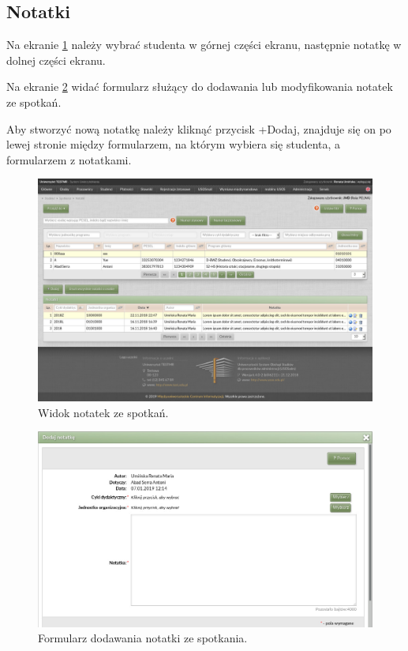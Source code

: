 \documentclass[licencjacka]{pracamgr}
\begin{document}
\subsection{Notatki}
Na ekranie \ref{fig:notatki} należy wybrać studenta w górnej części ekranu, następnie notatkę w dolnej części ekranu.

Na ekranie \ref{fig:formularz_notatek} widać formularz służący do dodawania lub modyfikowania notatek ze spotkań.

Aby stworzyć nową notatkę należy kliknąć przycisk \textsf{+Dodaj}, znajduje się on po lewej stronie między formularzem, na którym wybiera się studenta, a formularzem z notatkami. 

\begin{figure}[!]
  \includegraphics[width=\linewidth]{widok_notatek.jpg}
  \caption{Widok notatek ze spotkań.}
  \label{fig:notatki}
\end{figure}

\begin{figure}[!]
  \includegraphics[width=\linewidth]{formularz_notatek.jpg}
  \caption{Formularz dodawania notatki ze spotkania.}
  \label{fig:formularz_notatek}
\end{figure}
\end{document}
